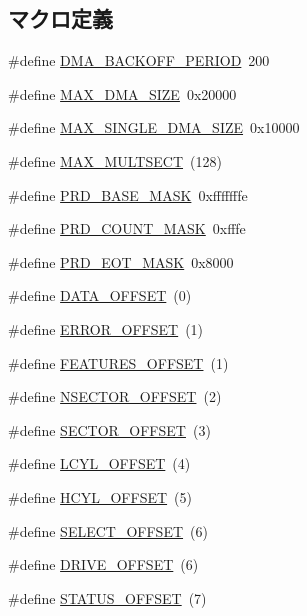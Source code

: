 \subsection*{マクロ定義}
\begin{DoxyCompactItemize}
\item 
\#define \hyperlink{ide__disk_8hh_a64bcea63cca60e512b1094c19fc4c587}{DMA\_\-BACKOFF\_\-PERIOD}~200
\item 
\#define \hyperlink{ide__disk_8hh_a941d6074126345e6acdf3d91ee305b11}{MAX\_\-DMA\_\-SIZE}~0x20000
\item 
\#define \hyperlink{ide__disk_8hh_ad950b58f27507f6e618a3ef8352ae796}{MAX\_\-SINGLE\_\-DMA\_\-SIZE}~0x10000
\item 
\#define \hyperlink{ide__disk_8hh_a78590681c8717cc04539b5c406dda023}{MAX\_\-MULTSECT}~(128)
\item 
\#define \hyperlink{ide__disk_8hh_a0bcee6e9fd01e441176bd95db85fb66f}{PRD\_\-BASE\_\-MASK}~0xfffffffe
\item 
\#define \hyperlink{ide__disk_8hh_add4e538b71947470f10c2c63183b63d3}{PRD\_\-COUNT\_\-MASK}~0xfffe
\item 
\#define \hyperlink{ide__disk_8hh_a7284616a4b3048d94f87562a8a38b751}{PRD\_\-EOT\_\-MASK}~0x8000
\item 
\#define \hyperlink{ide__disk_8hh_a11faa4c105a137b8edaa096de5063835}{DATA\_\-OFFSET}~(0)
\item 
\#define \hyperlink{ide__disk_8hh_a34da2490156c0fde3a3a9e8b658e6639}{ERROR\_\-OFFSET}~(1)
\item 
\#define \hyperlink{ide__disk_8hh_aa9c9d2fc107ac643f0a4b591955beaa9}{FEATURES\_\-OFFSET}~(1)
\item 
\#define \hyperlink{ide__disk_8hh_a3c028923d4dbc280c75f2d05a07af561}{NSECTOR\_\-OFFSET}~(2)
\item 
\#define \hyperlink{ide__disk_8hh_afe1c25cd3dcc7137056f351bb4bae70a}{SECTOR\_\-OFFSET}~(3)
\item 
\#define \hyperlink{ide__disk_8hh_a3c15c23524c451211d9eb469b602bb80}{LCYL\_\-OFFSET}~(4)
\item 
\#define \hyperlink{ide__disk_8hh_af4211242794af5adce364ae3025bbd58}{HCYL\_\-OFFSET}~(5)
\item 
\#define \hyperlink{ide__disk_8hh_adce132abdb19a249ce2627563386d64d}{SELECT\_\-OFFSET}~(6)
\item 
\#define \hyperlink{ide__disk_8hh_ab15fd72af5d7f9b9cb8c06f0d2e40b45}{DRIVE\_\-OFFSET}~(6)
\item 
\#define \hyperlink{ide__disk_8hh_ac3959778b8b4ee593c16fa33a06d844c}{STATUS\_\-OFFSET}~(7)

\end{DoxyCompactItemize}
